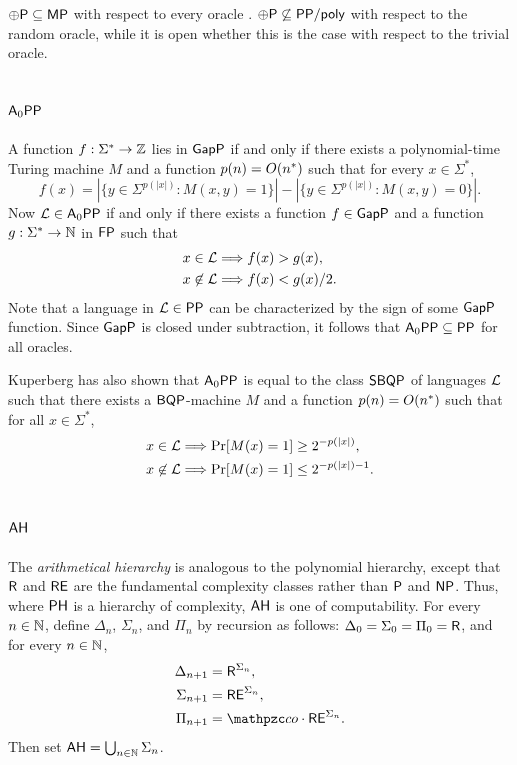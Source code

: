 $\oplus\mathsf{P}\subseteq\mathsf{MP}$ with respect to every oracle \cite{green1995power}.
$\oplus\mathsf{P}\not\subseteq\mathsf{PP}/\mathsf{poly}$ with respect to the random oracle, while 
it is open whether this is the case with respect to the trivial oracle.

\subsection{$\mathsf{A}_0\mathsf{PP}$}

A function $f:\Sigma^*\rightarrow\mathbb{Z}$ lies in $\mathsf{GapP}$ if and only if there
exists a polynomial-time Turing machine $M$ and a function $p(n)=O(n^*)$ such 
that for every $x\in\Sigma^*$,
\[
f(x)=|\{y\in\Sigma^{p(|x|)}:M(x,y)=1\}|-|\{y\in\Sigma^{p(|x|)}:M(x,y)=0\}|.
\]
Now $\mathcal{L}\in\mathsf{A}_0\mathsf{PP}$ if and only if there exists a function
$f\in\mathsf{GapP}$ and a function $g:\Sigma^*\rightarrow\mathbb{N}$ in $\mathsf{FP}$ such that
\begin{align*}
x\in\mathcal{L}&\Longrightarrow f(x)>g(x), \\
x\not\in\mathcal{L}&\Longrightarrow f(x)<g(x)/2.
\end{align*}
Note that a language in $\mathcal{L}\in\mathsf{PP}$ can be characterized by the sign of 
some $\mathsf{GapP}$ function. Since $\mathsf{GapP}$ is closed under subtraction, it 
follows that $\mathsf{A}_0\mathsf{PP}\subseteq\mathsf{PP}$ for all oracles.

Kuperberg has also shown \cite{kuperberg2009hard} that $\mathsf{A}_0\mathsf{PP}$ is equal
to the class $\mathsf{SBQP}$ of languages $\mathcal{L}$ such that there exists a 
$\mathsf{BQP}$-machine $M$ and a function $p(n)=O(n^*)$ such that for all 
$x\in\Sigma^*$,
\begin{align*}
x\in\mathcal{L}&\Longrightarrow\Pr[M(x)=1]\geq 2^{-p(|x|)}, \\
x\not\in\mathcal{L}&\Longrightarrow\Pr[M(x)=1]\leq 2^{-p(|x|)-1}.
\end{align*}

\subsection{$\mathsf{AH}$}

The \textit{arithmetical hierarchy} is analogous to the polynomial hierarchy,
except that $\mathsf{R}$ and $\mathsf{RE}$ are the fundamental complexity classes
rather than $\mathsf{P}$ and $\mathsf{NP}$. Thus, where $\mathsf{PH}$ is a hierarchy of 
complexity, $\mathsf{AH}$ is one of computability. For every $n\in\mathbb{N}$, define 
$\Delta_n$, $\Sigma_n$, and $\Pi_n$ by recursion as
follows: $\Delta_0=\Sigma_0=\Pi_0=\mathsf{R}$, and for every $n\in\mathbb{N}$,
\begin{align*}
\Delta_{n+1}&=\msf{R}^{\Sigma_n}, \\
\Sigma_{n+1}&=\msf{RE}^{\Sigma_n}, \\
\Pi_{n+1}&=\cco\cdot\msf{RE}^{\Sigma_n}.
\end{align*}
Then set $\mathsf{AH}=\bigcup_{n\in\mathbb{N}}\Sigma_n$.

